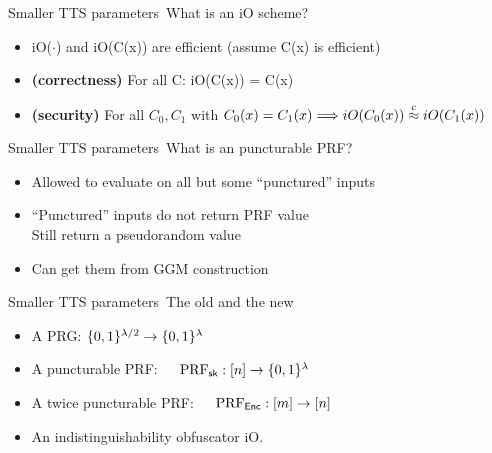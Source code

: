 \begin{frame}{Smaller TTS parameters~\cite{conf/tcc/KowalczykMUZ16}}{What is an
    iO scheme?}
  \begin{itemize}
  \item iO($\cdot$) and iO(C(x)) are efficient (assume C(x) is efficient)
  \item \textbf{(correctness)} For all C: iO(C(x)) = C(x)
  \item \textbf{(security)} For all $C_0,C_1$ with $C_0(x)=C_1(x) \Longrightarrow iO(C_0(x)) \stackrel{{\tiny{\mathrm{c}}}}{\approx} iO(C_1(x))$
  \end{itemize}
\end{frame}


\begin{frame}{Smaller TTS parameters~\cite{conf/tcc/KowalczykMUZ16}}{What is an
    puncturable PRF?}
  \begin{itemize}
  \item Allowed to evaluate on all but some ``punctured'' inputs
  \item ``Punctured'' inputs do not return PRF value
    \\Still return a pseudorandom value
  \item Can get them from GGM construction
  \end{itemize}
\end{frame}


\begin{frame}{Smaller TTS parameters~\cite{conf/tcc/KowalczykMUZ16}}{The old and the new}
\begin{itemize}
\item A PRG: $\{0,1\}^{\lambda/2} \rightarrow \{0,1\}^{\lambda}$
\item A puncturable PRF:~~~$\mathrm{PRF}_{\mathsf{sk}}:[n] \rightarrow
  \{0,1\}^{\lambda}$
\item A twice puncturable PRF:~~~$\mathrm{PRF}_{\mathsf{Enc}}:[m] \rightarrow [n]$
\item An indistinguishability obfuscator iO.
\end{itemize}
\end{frame}


